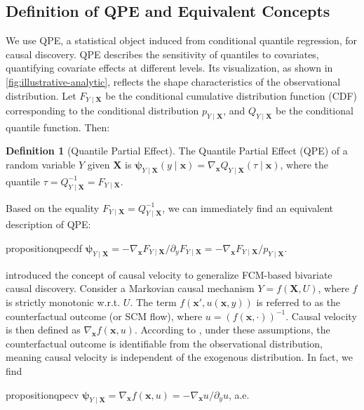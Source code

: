 \documentclass{article}
\theoremstyle{plain}
\theoremstyle{definition}
\newtheorem{definition}[theorem]{Definition}
\theoremstyle{remark}
\begin{document}
\subsection{Definition of QPE and Equivalent Concepts}

We use QPE, a statistical object induced from conditional quantile regression, for causal discovery. QPE describes the sensitivity of quantiles to covariates, quantifying covariate effects at different levels. Its visualization, as shown in \cref{fig:illustrative-analytic}, reflects the shape characteristics of the observational distribution. Let $F_{Y\mid\bm{X}}$ be the conditional cumulative distribution function (CDF) corresponding to the conditional distribution $p_{Y\mid\bm{X}}$, and $Q_{Y\mid\bm{X}}$ be the conditional quantile function. Then:

\begin{definition}[Quantile Partial Effect]
\label{def:qpe}
The Quantile Partial Effect (QPE) of a random variable $Y$ given $\bm{X}$ is $\bm{\psi}_{Y\mid\bm{X}}(y\!\mid\!\bm{x})=\nabla_{\bm{x}}Q_{Y\mid\bm{X}}(\tau\!\mid\!\bm{x})$, where the quantile $\tau=Q^{-1}_{Y\mid\bm{X}}=F_{Y\mid\bm{X}}$.
\end{definition}

Based on the equality $F_{Y\mid\bm{X}}=Q^{-1}_{Y\mid\bm{X}}$, we can immediately find an equivalent description of QPE:

\begin{restatable}{proposition}{qpecdf}
\label{prop:qpe-from-cdf}
$\bm{\psi}_{Y\mid\bm{X}}=-\nabla_{\bm{x}}F_{Y\mid\bm{X}}/\partial_yF_{Y\mid\bm{X}}=-\nabla_{\bm{x}}F_{Y\mid\bm{X}}/p_{Y\mid\bm{X}}$.
\end{restatable}

\citet{Xi2025} introduced the concept of causal velocity to generalize FCM-based bivariate causal discovery. Consider a Markovian causal mechanism $Y=f(\bm{X},U)$, where $f$ is strictly monotonic w.r.t. $U$. The term $f(\bm{x}',u(\bm{x},y))$ is referred to as the counterfactual outcome (or SCM flow), where $u=(f(\bm{x},\cdot))^{-1}$. Causal velocity is then defined as $\nabla_{\bm{x}}f(\bm{x},u)$. According to \citep{Nasr-Esfahany2023}, under these assumptions, the counterfactual outcome is identifiable from the observational distribution, meaning causal velocity is independent of the exogenous distribution. In fact, we find

\begin{restatable}{proposition}{qpecv}
\label{prop:cv-is-qpe}
$\bm{\psi}_{Y\mid\bm{X}}=\nabla_{\bm{x}}f(\bm{x},u)=-\nabla_{\bm{x}}u/\partial_yu$, a.e.
\end{restatable}
\end{document}
